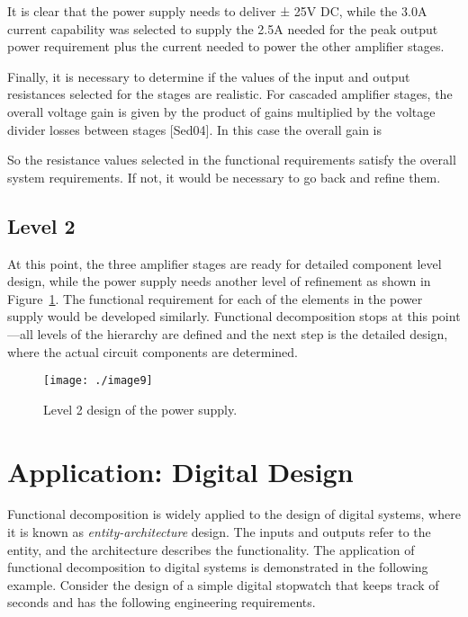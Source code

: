 It is clear that the power supply needs to deliver ± 25V DC, while the
3.0A current capability was selected to supply the 2.5A needed for the
peak output power requirement plus the current needed to power the other
amplifier stages.

Finally, it is necessary to determine if the values of the input and
output resistances selected for the stages are realistic. For cascaded
amplifier stages, the overall voltage gain is given by the product of
gains multiplied by the voltage divider losses between stages
{[}Sed04{]}. In this case the overall gain is


So the resistance values selected in the functional requirements satisfy
the overall system requirements. If not, it would be necessary to go
back and refine them.

\subsection*{Level 2}
\label{subsection:level-2}

At this point, the three amplifier stages are ready for detailed
component level design, while the power supply needs another level of
refinement as shown in Figure~\ref{figure:level2PowerSupply}. 
The functional requirement for each
of the elements in the power supply would be developed similarly.
Functional decomposition stops at this point---all levels of the
hierarchy are defined and the next step is the detailed design, where
the actual circuit components are determined.

\begin{figure}
\texttt{[image: ./image9]}
\caption{Level 2 design of the power supply.}
\label{figure:level2PowerSupply}
\end{figure}

\section{Application: Digital Design}
\label{section:application-digital-design}

Functional decomposition is widely applied to the design of digital
systems, where it is known as \emph{entity-architecture} design. The
inputs and outputs refer to the entity, and the architecture describes
the functionality. The application of functional decomposition to
digital systems is demonstrated in the following example. Consider the
design of a simple digital stopwatch that keeps track of seconds and has
the following engineering requirements.

